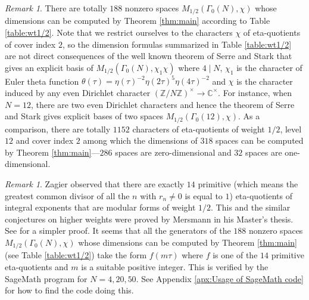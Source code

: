 \documentclass[12pt]{amsart}
\numberwithin{equation}{section}
\theoremstyle{plain}
\theoremstyle{definition}
\theoremstyle{remark}
\newtheorem{rema}[thm]{Remark}
\newcommand\numZ{\mathbb{Z}}
\newcommand\numC{\mathbb{C}}
\begin{document}
\begin{rema}
There are totally $188$ nonzero spaces $M_{1/2}(\Gamma_0(N),\chi)$ whose dimensions can be computed by Theorem \ref{thm:main} according to Table \ref{table:wt1/2}. Note that we restrict ourselves to the characters $\chi$ of eta-quotients of cover index $2$, so the dimension formulas summarized in Table \ref{table:wt1/2} are not direct consequences of the well known theorem of Serre and Stark \cite{SS77} that gives an explicit basis of $M_{1/2}(\Gamma_0(N),\chi_1\chi)$ where $4 \mid N$, $\chi_1$ is the character of Euler theta function $\theta(\tau)=\eta(\tau)^{-2}\eta(2\tau)^5\eta(4\tau)^{-2}$ and $\chi$ is the character induced by any even Dirichlet character $(\numZ/N\numZ)^\times\to\numC^\times$. For instance, when $N=12$, there are two even Dirichlet characters and hence the theorem of Serre and Stark gives explicit bases of two spaces $M_{1/2}(\Gamma_0(12),\chi)$. As a comparison, there are totally $1152$ characters of eta-quotients of weight $1/2$, level $12$ and cover index $2$ among which the dimensions of $318$ spaces can be computed by Theorem \ref{thm:main}---$286$ spaces are zero-dimensional and $32$ spaces are one-dimensional.
\end{rema}
\begin{rema}
Zagier observed that there are exactly $14$ primitive (which means the greatest common divisor of all the $n$ with $r_n\neq 0$ is equal to $1$) eta-quotients of integral exponents that are modular forms of weight $1/2$. This and the similar conjectures on higher weights were proved by Mersmann in his Master's thesis. See \cite{Bha17} for a simpler proof. It seems that all the generators of the $188$ nonzero spaces $M_{1/2}(\Gamma_0(N),\chi)$ whose dimensions can be computed by Theorem \ref{thm:main} (see Table \ref{table:wt1/2}) take the form $f(m\tau)$ where $f$ is one of the $14$ primitive eta-quotients and $m$ is a suitable positive integer. This is verified by the SageMath program for $N=4,20,50$. See Appendix \ref{apx:Usage of SageMath code} for how to find the code doing this.
\end{rema}
\end{document}
